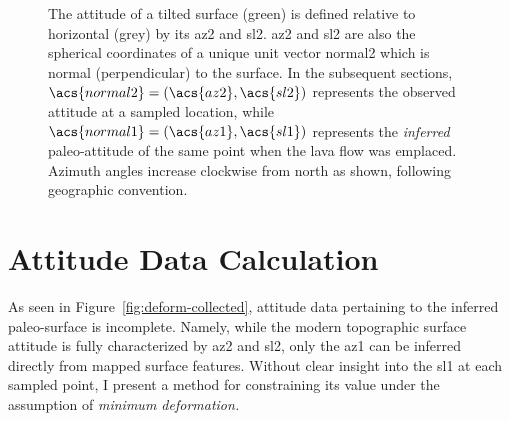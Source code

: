 \begin{figure}
    {\caption[Pole to plane $\acs{normal2}=(\acs{az2},\acs{sl2})$]{The attitude of a tilted surface (green) is defined relative to horizontal (grey) by its \acf{az2} and \acf{sl2}. \acs{az2} and \acs{sl2} are also the spherical coordinates of a unique unit vector \acs{normal2} which is normal (perpendicular) to the surface. In the subsequent sections, $\acs{normal2}=(\acs{az2},\acs{sl2})$ represents the observed attitude at a sampled location, while $\acs{normal1}=(\acs{az1},\acs{sl1})$ represents the \emph{inferred} paleo-attitude of the same point when the lava flow was emplaced. Azimuth angles increase clockwise from \acf{north} as shown, following geographic convention.}\label{fig:surface}}
    {}
\end{figure}

\section{Attitude Data Calculation}\label{sec:calculation}

As seen in Figure~\ref{fig:deform-collected}, attitude data pertaining to the inferred paleo-surface is incomplete. Namely, while the modern topographic surface attitude is fully characterized by \acs{az2} and \acs{sl2}, only the \acf{az1} can be inferred directly from mapped surface features. Without clear insight into the \acf{sl1} at each sampled point, I present a method for constraining its value under the assumption of \emph{minimum deformation.} 

